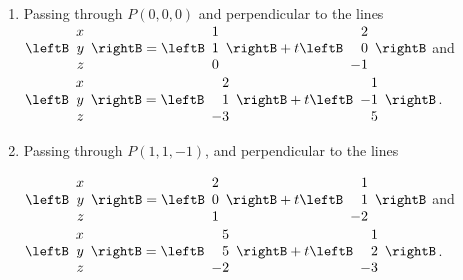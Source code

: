 \begin{multicols}{2}
\begin{ex}
\begin{enumerate}[label={\alph*.}]
\item Passing through $P(0, 0, 0)$ and perpendicular to the lines
$\leftB
\begin{array}{r}
x\\
y\\
z
\end{array}
\rightB
=
\leftB
\begin{array}{r}
1\\
1\\
0
\end{array}
\rightB
+t
\leftB
\begin{array}{r}
2\\
0\\
-1
\end{array}
\rightB 
$ and
$\leftB
\begin{array}{r}
x\\
y\\
z
\end{array}
\rightB
=
\leftB
\begin{array}{r}
2\\
1\\
-3
\end{array}
\rightB
+t
\leftB
\begin{array}{r}
1\\
-1\\
5
\end{array}
\rightB$.
\item Passing through $P(1, 1, -1)$, and perpendicular to the lines

$\leftB
\begin{array}{r}
x\\
y\\
z
\end{array}
\rightB
=
\leftB
\begin{array}{r}
2\\
0\\
1
\end{array}
\rightB
+t
\leftB
\begin{array}{r}
1\\
1\\
-2
\end{array}
\rightB 
$ and
 \\$\leftB
\begin{array}{r}
x\\
y\\
z
\end{array}
\rightB
=
\leftB
\begin{array}{r}
5\\
5\\
-2
\end{array}
\rightB
+t
\leftB
\begin{array}{r}
1\\
2\\
-3
\end{array}
\rightB$.


\end{enumerate}
\end{ex}
\end{multicols}

